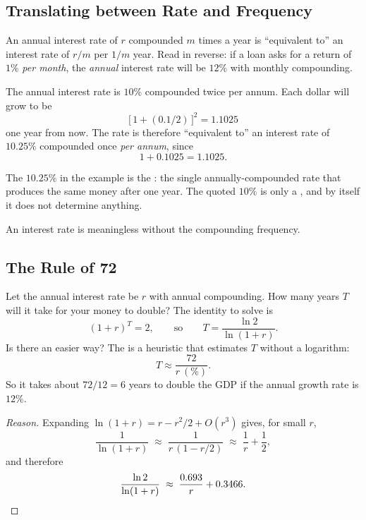 \subsection{Translating between Rate and Frequency}
\label{sec:rate-frequency}


An annual interest rate of $r$ compounded $m$ times a year is ``equivalent to'' an interest rate of $r/m$ per $1/m$ year.
Read in reverse: if a loan asks for a return of $1\%$ \emph{per month}, the \emph{annual} interest rate will be $12\%$ with monthly compounding.

\begin{eg}
	The annual interest rate is $10\%$ compounded twice per annum.
	Each dollar will grow to be
	\[
		\bigl[\,1+(0.1/2)\,\bigr]^{2} = 1.1025
	\]
	one year from now.
	The rate is therefore ``equivalent to'' an interest rate of $10.25\%$ compounded once \emph{per annum}, since
	\[
		1 + 0.1025 = 1.1025 .
	\]
\end{eg}

\suppstart
The $10.25\%$ in the example is the : the single annually-compounded rate that produces the same money after one year.
The quoted $10\%$ is only a , and by itself it does not determine anything.
\suppend

\begin{moral}
	An interest rate is meaningless without the compounding frequency.
\end{moral}

\subsection{The Rule of 72}


Let the annual interest rate be $r$ with annual compounding.
How many years $T$ will it take for your money to double?
The identity to solve is
\[
	(1+r)^{T} = 2,
	\qquad\text{so}\qquad
	T = \frac{\ln 2}{\ln (1+r)} .
\]
Is there an easier way?
The  is a heuristic that estimates $T$ without a logarithm:
\begin{equation}
	T \approx \frac{72}{r\ (\%)} . \label{eq:rule72}
\end{equation}
So it takes about $72/12 = 6$ years to double the GDP if the annual growth rate is $12\%$.

\suppstart
\begin{proof}[Reason]
	Expanding $\ln(1+r) = r - r^{2}/2 + O(r^{3})$ gives, for small $r$,
	\[
		\frac{1}{\ln(1+r)}
		\;\approx\; \frac{1}{r\,(1-r/2)}
		\;\approx\; \frac{1}{r} + \frac{1}{2},
	\]
	and therefore
	\[
		\frac{\ln 2}{\ln(1+r)} \;\approx\; \frac{0.693}{r} + 0.3466 . \qedhere
	\]
\end{proof}

